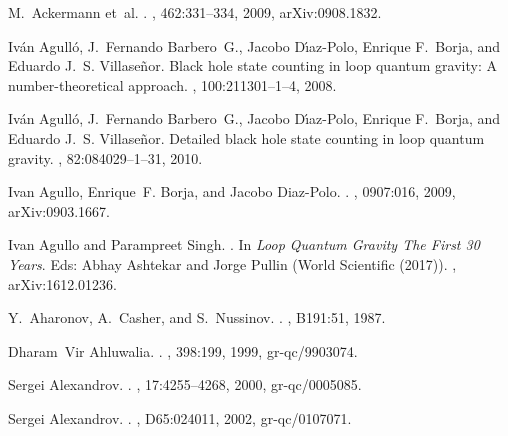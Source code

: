 \documentclass[aps, nofootinbib,superscriptaddress,12pt]{revtex4-2}
\begin{document}
%
%

\begin{thebibliography}{100}

\raggedright

M.~Ackermann et~al.
.
, 462:331--334, 2009, arXiv:0908.1832.

Iv\'an Agull\'o, J.~Fernando Barbero~G., Jacobo D\'{\i}az-Polo, Enrique
  F.~Borja, and Eduardo J.~S. Villase\~nor.
\newblock Black hole state counting in loop quantum gravity: A
  number-theoretical approach.
, 100:211301--1--4, 2008.

Iv\'an Agull\'o, J.~Fernando Barbero~G., Jacobo D\'{\i}az-Polo, Enrique
  F.~Borja, and Eduardo J.~S. Villase\~nor.
\newblock Detailed black hole state counting in loop quantum gravity.
, 82:084029--1--31, 2010.

Ivan Agullo, Enrique~F. Borja, and Jacobo Diaz-Polo.
.
, 0907:016, 2009, arXiv:0903.1667.

Ivan Agullo and Parampreet Singh.
.
In  {\em Loop Quantum Gravity The First 30 Years}.
Eds: Abhay Ashtekar and Jorge Pullin (World Scientific (2017)).
, arXiv:1612.01236.

Y.~Aharonov, A.~Casher, and S.~Nussinov.
.
, B191:51, 1987.

Dharam~Vir Ahluwalia.
.
, 398:199, 1999, gr-qc/9903074.

Sergei Alexandrov.
.
, 17:4255--4268, 2000, gr-qc/0005085.

Sergei Alexandrov.
.
, D65:024011, 2002, gr-qc/0107071.


\end{thebibliography}
\end{document}
